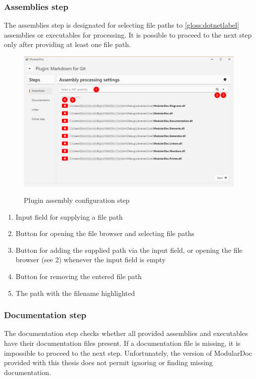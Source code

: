 \subsubsection{Assemblies step}

The assemblies step is designated for selecting file paths to \ref{gloss:dotnetlabel} assemblies or executables for processing. It is possible to proceed to the next step only after providing at least one file path.

\begin{figure}[H]
    \includegraphics[width=\linewidth]{img/modularDocAssemblies.png}
    \label{fig:modularAssemblies}
    \caption{Plugin assembly configuration step}
\end{figure}

\begin{enumerate}
    \item Input field for supplying a file path
    \item Button for opening the file browser and selecting file paths
    \item Button for adding the supplied path via the input field, or opening the file browser (see 2) whenever the input field is empty
    \item Button for removing the entered file path
    \item The path with the filename highlighted
\end{enumerate}

\pagebreak
\subsubsection{Documentation step}

The documentation step checks whether all provided assemblies and executables have their documentation files present. If a documentation file is missing, it is impossible to proceed to the next step. Unfortunately, the version of ModularDoc provided with this thesis does not permit ignoring or finding missing documentation.

